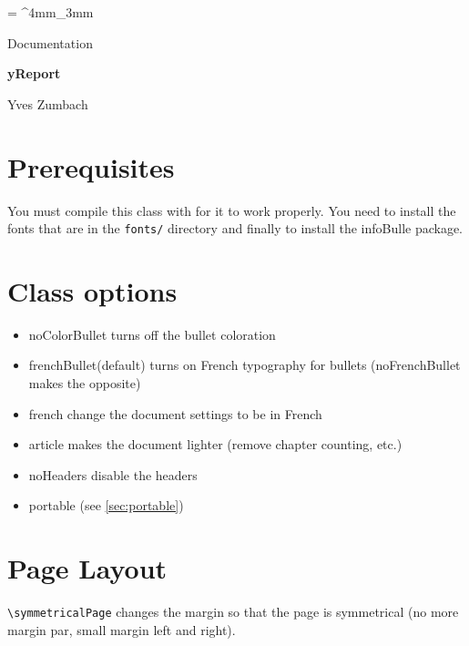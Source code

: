 \documentclass[a4paper, 11pt, oneside, fleqn]{article}
\newcommand{\inColor}[1]{{\bfseries\color{mainColor}#1}}
\newcommand{\myTitle}{\inColor{\fontsize{1.3cm}{1em}\selectfont yReport}}
\begin{document}
	\everyrow{\tabucline[.4mm  white]{}}
	\tabulinesep = ^4mm_3mm
	

	\begin{flushleft}
		\begin{minipage}{\widthof{\myTitle}}
			{\fontsize{.6cm}{1em}\selectfont\color{mainColor}
				Documentation
			}
			\begin{spacing}{3}
				\myTitle
			\end{spacing}
			\vspace*{-10mm}
			\begin{flushright}
				Yves Zumbach
			\end{flushright}
		\end{minipage}
	\end{flushleft}
	
	
	\newpage
	{
		\hypersetup{linkcolor=black}
		\tableofcontents
	}
	\newpage
	
	\section{Prerequisites}
	You must compile this class with \XeLaTeX for it to work properly. You need to install the fonts that are in the \lstinline[breaklines]|fonts/| directory and finally to install the infoBulle package.
	
	\section{Class options}
	\begin{itemize}
		\item noColorBullet turns off the bullet coloration
		\item frenchBullet(default) turns on French typography for bullets (noFrenchBullet makes the opposite)
		\item french change the document settings to be in French
		\item article makes the document lighter (remove chapter counting, etc.)
		\item noHeaders disable the headers
		\item portable (see \ref{sec:portable})
	\end{itemize}
	
	\section{Page Layout}
	\lstinline[breaklines]|\symmetricalPage| changes the margin so that the page is symmetrical (no more margin par, small margin left and right).
	
\end{document}
